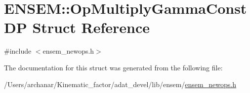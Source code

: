 \hypertarget{structENSEM_1_1OpMultiplyGammaConstDP}{}\section{E\+N\+S\+EM\+:\+:Op\+Multiply\+Gamma\+Const\+DP Struct Reference}
\label{structENSEM_1_1OpMultiplyGammaConstDP}


{\ttfamily \#include $<$ensem\+\_\+newops.\+h$>$}



The documentation for this struct was generated from the following file\+:\begin{DoxyCompactItemize}
\item 
/\+Users/archanar/\+Kinematic\+\_\+factor/adat\+\_\+devel/lib/ensem/\mbox{\hyperlink{lib_2ensem_2ensem__newops_8h}{ensem\+\_\+newops.\+h}}\end{DoxyCompactItemize}
